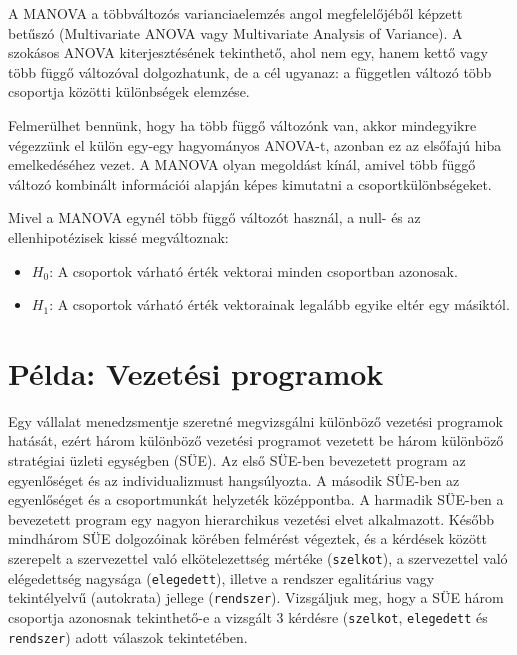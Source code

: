 \documentclass[
  letterpaper,
]{krantz}
\providecommand{\tightlist}{%
  \setlength{\itemsep}{0pt}\setlength{\parskip}{0pt}}\usepackage{longtable,booktabs,array}
\begin{document}
A MANOVA a többváltozós varianciaelemzés angol megfelelőjéből képzett
betűszó (Multivariate ANOVA vagy Multivariate Analysis of Variance). A
szokásos ANOVA kiterjesztésének tekinthető, ahol nem egy, hanem kettő
vagy több függő változóval dolgozhatunk, de a cél ugyanaz: a független
változó több csoportja közötti különbségek elemzése.

Felmerülhet bennünk, hogy ha több függő változónk van, akkor mindegyikre
végezzünk el külön egy-egy hagyományos ANOVA-t, azonban ez az elsőfajú
hiba emelkedéséhez vezet. A MANOVA olyan megoldást kínál, amivel több
függő változó kombinált információi alapján képes kimutatni a
csoportkülönbségeket.

Mivel a MANOVA egynél több függő változót használ, a null- és az
ellenhipotézisek kissé megváltoznak:

\begin{itemize}
\tightlist
\item
  \(H_0\): A csoportok várható érték vektorai minden csoportban
  azonosak.
\item
  \(H_1\): A csoportok várható érték vektorainak legalább egyike eltér
  egy másiktól.
\end{itemize}

\hypertarget{puxe9lda-vezetuxe9si-programok-1}{%
\section{Példa: Vezetési
programok}\label{puxe9lda-vezetuxe9si-programok-1}}

Egy vállalat menedzsmentje szeretné megvizsgálni különböző vezetési
programok hatását, ezért három különböző vezetési programot vezetett be
három különböző stratégiai üzleti egységben (SÜE). Az első SÜE-ben
bevezetett program az egyenlőséget és az individualizmust hangsúlyozta.
A második SÜE-ben az egyenlőséget és a csoportmunkát helyzeték
középpontba. A harmadik SÜE-ben a bevezetett program egy nagyon
hierarchikus vezetési elvet alkalmazott. Később mindhárom SÜE
dolgozóinak körében felmérést végeztek, és a kérdések között szerepelt a
szervezettel való elkötelezettség mértéke (\texttt{szelkot}), a
szervezettel való elégedettség nagysága (\texttt{elegedett}), illetve a
rendszer egalitárius vagy tekintélyelvű (autokrata) jellege
(\texttt{rendszer}). Vizsgáljuk meg, hogy a SÜE három csoportja
azonosnak tekinthető-e a vizsgált 3 kérdésre (\texttt{szelkot},
\texttt{elegedett} és \texttt{rendszer}) adott válaszok tekintetében.
\end{document}
